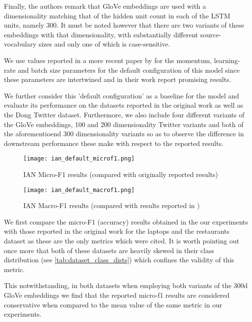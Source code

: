 \documentclass[../../fyp.tex]{subfiles}
\begin{document}
Finally, the authors remark that GloVe \cite{pennington} embeddings are used with a dimensionality matching that of the hidden unit count in each of the LSTM units, namely 300. It must be noted however that there are two variants of these embeddings with that dimensionality, with substantially different source-vocabulary sizes and only one of which is case-sensitive.

We use values reported in a more recent paper by \citet{zhang2018} for the momentum, learning-rate and batch size parameters for the default configuration of this model since these parameters are intertwined and in their work \cite{zhang2018} report promising results. 

We further consider this 'default configuration' as a baseline for the model and evaluate its performance on the datasets reported in the original work as well as the Dong Twitter dataset. Furthermore, we also include four different variants of the GloVe embeddings, 100 and 200 dimensionality Twitter variants and both of the aforementioend 300 dimensionality variants so as to observe the difference in downstream performance these make with respect to the reported results. 

\begin{figure}[!ht]
	\centering
	\texttt{[image: ian\_default\_microf1.png]}
	\caption{IAN Micro-F1 results (compared with originally reported results)}
	\label{fig:ian_default_microf1}
\end{figure}

\begin{figure}[!ht]
	\centering
	\texttt{[image: ian\_default\_macrof1.png]}
	\caption{IAN Macro-F1 results (compared with results reported in \citet{navonil2020})}
	\label{fig:ian_default_macrof1}
\end{figure}

We first compare the micro-F1 (accuracy) results obtained in the our experiments with those reported in the original work \cite{dehongma2017} for the laptops and the restaurants dataset as these are the only metrics which were cited. It is worth pointing out once more that both of these datasets are heavily skewed in their class distribution (see \ref{tab:dataset_class_dists}) which confines the validity of this metric.

This notwithstanding, in both datasets when employing both variants of the 300d GloVe embeddings we find that the reported micro-f1 results are considered conservative when compared to the mean value of the same metric in our experiments. 
\end{document}
